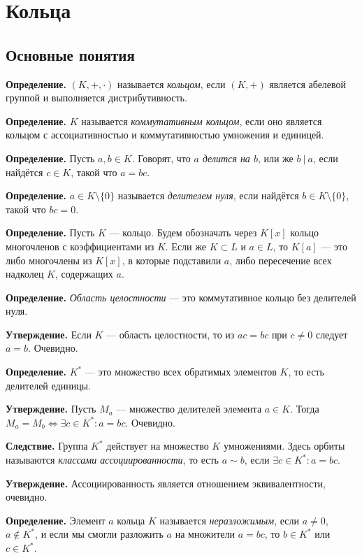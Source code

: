 \section{Кольца}
\subsection{Основные понятия}
\textbf{Определение.} $(K, +, \cdot)$ называется \textit{кольцом}, если $(K, +)$ является абелевой группой и выполняется дистрибутивность.

\textbf{Определение.} $K$ называется \textit{коммутативным кольцом}, если оно является кольцом с ассоциативностью и коммутативностью умножения и единицей.

\textbf{Определение.} Пусть $a, b \in K$.
Говорят, что \textit{$a$ делится на $b$}, или же $b~|~a$, если найдётся $c \in K$, такой что $a = bc$.

\textbf{Определение.} $a \in K \setminus \{0\}$ называется \textit{делителем нуля}, если найдётся $b \in  K \setminus \{0\}$, такой что $bc = 0$.

\textbf{Определение.} Пусть $K$ --- кольцо. Будем обозначать через $K[x]$ кольцо многочленов с коэффициентами из $K$.
Если же $K \subset L$ и $a \in L$, то $K[a]$ --- это либо многочлены из $K[x]$, в которые подставили $a$, либо пересечение всех надколец $K$, содержащих $a$.

\textbf{Определение.} \textit{Область целостности} --- это коммутативное кольцо без делителей нуля.

\textbf{Утверждение.} Если $K$ --- область целостности, то из $ac = bc$ при $c \ne 0$ следует $a = b$. Очевидно.

\textbf{Определение.} $K^*$ --- это множество всех обратимых элементов $K$, то есть делителей единицы.

\textbf{Утверждение.} Пусть $M_a$ --- множество делителей элемента $a \in K$.
Тогда $M_a = M_b \iff \exists c \in K^*: a = bc$. Очевидно.

\textbf{Следствие.} Группа $K^*$ действует на множество $K$ умножениями.
Здесь орбиты называются \textit{классами ассоциированности}, то есть $a \sim b$, если $\exists c \in K^*: a = bc$.

\textbf{Утверждение.} Ассоциированность является отношением эквивалентности, очевидно.

\textbf{Определение.} Элемент $a$ кольца $K$ называется \textit{неразложимым}, если $a \ne 0$, $a \not\in K^*$, и если мы смогли разложить $a$ на множители $a = bc$, то $b \in K^*$ или $c \in K^*$.

